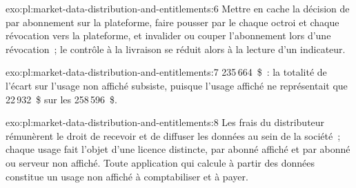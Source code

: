 \begin{solution}{exo:pl:market-data-distribution-and-entitlements:6}
Mettre en cache la décision de  par abonnement sur la plateforme, faire pousser par le  chaque octroi et chaque révocation vers la plateforme,
et invalider ou couper l'abonnement lors d'une révocation~; le contrôle à la livraison se réduit alors à la lecture d'un indicateur.
\end{solution}

\begin{solution}{exo:pl:market-data-distribution-and-entitlements:7}
235\,664~\$~: la totalité de l'écart sur l'usage non affiché subsiste, puisque l'usage affiché ne représentait que 22\,932~\$ sur les 258\,596~\$.
\end{solution}

\begin{solution}{exo:pl:market-data-distribution-and-entitlements:8}
Les frais du distributeur rémunèrent le droit de recevoir et de diffuser les données au sein de la société~; chaque usage fait l'objet d'une licence distincte, par
abonné affiché et par abonné ou serveur non affiché. Toute application qui calcule à partir des données constitue un usage non affiché à comptabiliser et à payer.
\end{solution}

